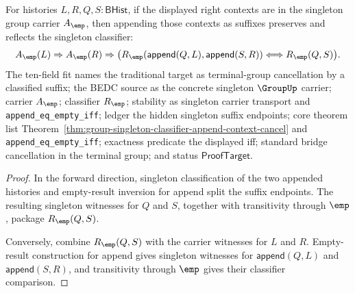 \begin{theorem}
\label{thm:group-singleton-classifier-right-context-cancel}
For histories $L,R,Q,S:\mathsf{BHist}$, if the displayed right contexts are in
the singleton group carrier $A_{\emp}$, then appending those contexts as
suffixes preserves and reflects the singleton classifier:
$$
A_{\emp}(L)\Rightarrow A_{\emp}(R)\Rightarrow
\bigl(
R_{\emp}(\mathsf{append}(Q,L),\mathsf{append}(S,R))
\Longleftrightarrow
R_{\emp}(Q,S)
\bigr).
$$
The ten-field fit names the traditional target as terminal-group cancellation
by a classified suffix; the BEDC source as the concrete singleton $\GroupUp$
carrier; carrier $A_{\emp}$; classifier $R_{\emp}$; stability as singleton
carrier transport and \texttt{append\_eq\_empty\_iff}; ledger the hidden
singleton suffix endpoints; core theorem list
Theorem~\ref{thm:group-singleton-classifier-append-context-cancel} and
\texttt{append\_eq\_empty\_iff}; exactness predicate the displayed iff;
standard bridge cancellation in the terminal group; and status
$\mathsf{ProofTarget}$.
\end{theorem}
\begin{proof}
In the forward direction, singleton classification of the two appended
histories and empty-result inversion for append split the suffix endpoints.
The resulting singleton witnesses for $Q$ and $S$, together with transitivity
through $\emp$, package $R_{\emp}(Q,S)$.

Conversely, combine $R_{\emp}(Q,S)$ with the carrier witnesses for $L$ and
$R$. Empty-result construction for append gives singleton witnesses for
$\mathsf{append}(Q,L)$ and $\mathsf{append}(S,R)$, and transitivity through
$\emp$ gives their classifier comparison.
\end{proof}

